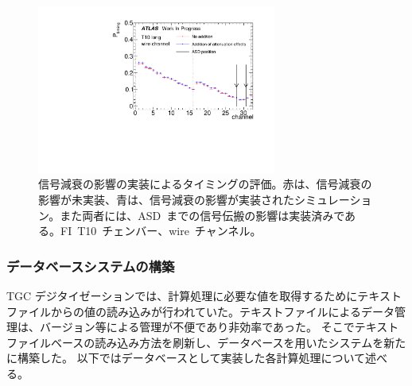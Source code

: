 \begin{figure}[H]
    \centering   
    \includegraphics[width=0.7\textwidth,page=1]{img/plot/att.pdf}
    \caption[信号減衰の影響の実装によるタイミングの評価]{信号減衰の影響の実装によるタイミングの評価。赤は、信号減衰の影響が未実装、青は、信号減衰の影響が実装されたシミュレーション。また両者には、ASD~までの信号伝搬の影響は実装済みである。FI~T10~チェンバー、wire~チャンネル。}
    \label{fig:att}
\end{figure}

\subsubsection{データベースシステムの構築}
TGC デジタイゼーションでは、計算処理に必要な値を取得するためにテキストファイルからの値の読み込みが行われていた。テキストファイルによるデータ管理は、バージョン等による管理が不便であり非効率であった。
そこでテキストファイルベースの読み込み方法を刷新し、データベースを用いたシステムを新たに構築した。
以下ではデータベースとして実装した各計算処理について述べる。


